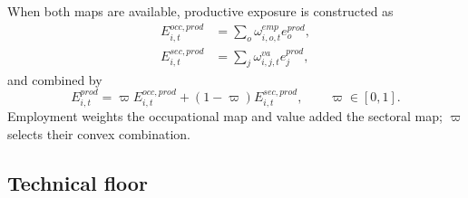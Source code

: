 \documentclass[11pt,a4paper]{article}
\begin{document}
When both maps are available, productive exposure is constructed as
\begin{align}
    E^{occ,prod}_{i,t}&=\sum_o \omega^{emp}_{i,o,t}e^{prod}_o,\\
    E^{sec,prod}_{i,t}&=\sum_j \omega^{va}_{i,j,t}e^{prod}_j,
\end{align}
and combined by
\begin{equation}
    E^{prod}_{i,t}=\varpi E^{occ,prod}_{i,t}+(1-\varpi)E^{sec,prod}_{i,t},
    \qquad \varpi\in[0,1].
\end{equation}
Employment weights the occupational map and value added the sectoral map; $\varpi$ selects their convex combination.

\subsection{Technical floor}
\end{document}
